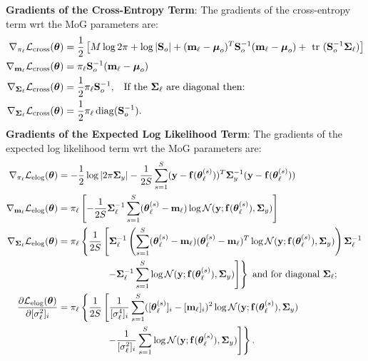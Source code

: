 \textbf{Gradients of the Cross-Entropy Term}: The gradients of the cross-entropy term wrt the MoG parameters are:
\begin{align}
	\gradient_{\pil}\lcross(\vectheta) 
	&=  \frac{1}{2} \left[ M \log 2\pi + \log \det{\Sigmao} + (\mql - \muo)^{T} \Sigmao^{-1} (\mql - \muo) + \trace(\Sigmao^{-1} \Sigmaql)\right]\\
       \gradient_{\mql}\lcross(\vectheta) 
       & = \pil \Sigmao^{-1}(\mql - \muo) \\
	\gradient_{\Sigmaql}\lcross(\vectheta)        
	&= \frac{1}{2}\pil \Sigmao^{-1} \text{,} \quad \text{If the } \Sigmaql \text{ are diagonal then:} \\
\gradient_{\Sigmaql}\lcross(\vectheta)        
	&= \frac{1}{2} \pil \diag(\Sigmao^{-1}) \text{.}
\end{align}
%
\textbf{Gradients of the Expected Log Likelihood Term}:  The gradients of the expected log likelihood term wrt the MoG parameters are:
\begin{align}
\gradient_{\pil}\lelog(\vectheta)
& = -\frac{1}{2} \log \det{2 \pi \Sigmay} - \frac{1}{2S} \sum_{s=1}^{S} (\vecy - \fthetasl)^{T} \Sigmay^{-1} (\vecy - \fthetasl) \\
\gradient_{\mql}\lelog(\vectheta)
&= \pil \left[ - \frac{1}{2S} \Sigmaql^{-1} \sum_{s=1}^{S} (\thetasl - \mql) \log \Normal(\vecy; \fthetasl, \Sigmay ) \right] \\
\gradient_{\Sigmaql}\lelog(\vectheta)
&= \pil \left\{  \frac{1}{2S} \left[ \Sigmaql^{-1} \left( \sum_{s=1}^{S} (\thetasl - \mql) (\thetasl - \mql)^{T} \log \Normal(\vecy; \fthetasl, \Sigmay ) \right)\Sigmaql^{-1} \right. \right. \\
& \qquad \qquad \quad \left. \left. - \Sigmaql^{-1} \sum_{s=1}^{S}  \log \Normal(\vecy; \fthetasl, \Sigmay )   \right]  \right\} \text{ and for diagonal } \Sigmaql \text{;}\\
\deriv{\lelog(\vectheta)}{\sigmatwoli}
& = \pil \left\{ \frac{1}{2S} \left[ \frac{1}{\sigmafourli} \sum_{s=1}^{S} ([\thetasl]_{i} - [\mql]_{i})^{2} \log \Normal(\vecy; \fthetasl, \Sigmay )
\right. \right.  \\
&  \qquad \qquad \quad \left. \left.  - \frac{1}{\sigmatwoli} \sum_{s=1}^{S}  \log \Normal(\vecy; \fthetasl, \Sigmay )   \right]  \right\}  \text{.}
\end{align}






